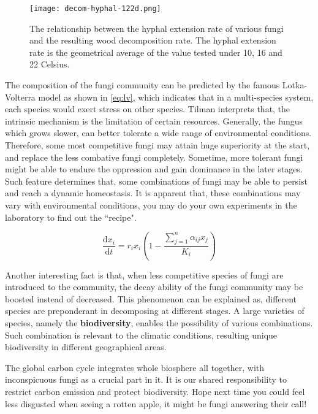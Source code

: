 \begin{figure}
    \centering
    \texttt{[image: decom-hyphal-122d.png]}
    \caption{The relationship between the hyphal extension rate of various fungi and the resulting wood decomposition rate. The hyphal extension rate is the geometrical average of the value tested under 10, 16 and 22 Celsius.}
\end{figure}

The composition of the fungi community can be predicted by the famous Lotka-Volterra model as shown in \eqref{eq:lv}, which indicates that in a multi-species system, each species would exert stress on other species. Tilman interprets that, the intrinsic mechanism is the limitation of certain resources. Generally, the fungus which grows slower, can better tolerate a wide range of environmental conditions. Therefore, some most competitive fungi may attain huge superiority at the start, and replace the less combative fungi completely. Sometime, more tolerant fungi might be able to endure the oppression and gain dominance in the later stages. Such feature determines that, some combinations of fungi may be able to persist and reach a dynamic homeostasis. It is apparent that, these combinations may vary with environmental conditions, you may do your own experiments in the laboratory to find out the ``recipe".

\[
    \label{eq:lv}\tag{$\ast$}
    \frac{\mathrm{d}x_i}{\mathrm{d}t} =
    r_ix_i\left(1 - \frac{\sum_{j=1}^n \alpha_{ij}x_j}{K_i}\right)
\]

Another interesting fact is that, when less competitive species of fungi are introduced to the community, the decay ability of the fungi community may be boosted instead of decreased. This phenomenon can be explained as, different species are preponderant in decomposing at different stages. A large varieties of species, namely the \textbf{biodiversity}, enables the possibility of various combinations. Such combination is relevant to the climatic conditions, resulting unique biodiversity in different geographical areas.

The global carbon cycle integrates whole biosphere all together, with inconspicuous fungi as a crucial part in it. It is our shared responsibility to restrict carbon emission and protect biodiversity. Hope next time you could feel less disgusted when seeing a rotten apple, it might be fungi answering their call!
